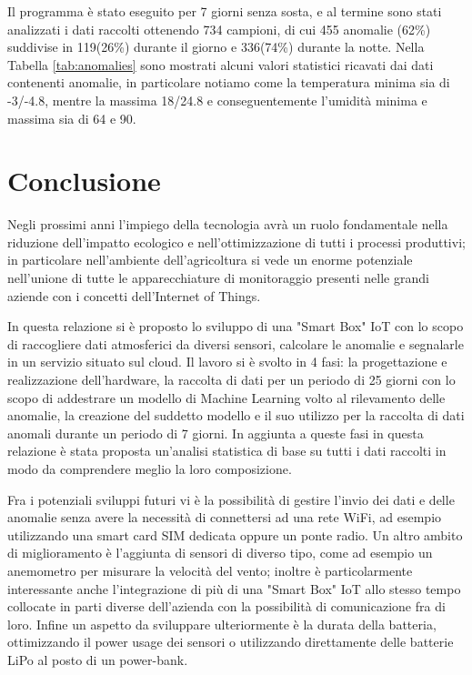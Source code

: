 \documentclass[fleqn, 10pt]{SelfArx}
\begin{document}
Il programma è stato eseguito per 7 giorni senza sosta, e al termine sono stati analizzati i dati raccolti ottenendo 734 campioni, di cui 455 anomalie (62\%) suddivise in 119(26\%) durante il giorno e 336(74\%) 
durante la notte. Nella Tabella \ref{tab:anomalies} sono mostrati alcuni valori statistici ricavati dai dati contenenti anomalie, in particolare notiamo come la temperatura minima sia di -3/-4.8, mentre la 
massima 18/24.8 e conseguentemente l'umidità minima e massima sia di 64 e 90.

\section{Conclusione}

Negli prossimi anni l'impiego della tecnologia avrà un ruolo fondamentale nella riduzione dell'impatto ecologico e nell'ottimizzazione di tutti i processi produttivi; in particolare nell'ambiente dell'agricoltura
si vede un enorme potenziale nell'unione di tutte le apparecchiature di monitoraggio presenti nelle grandi aziende con i concetti dell'Internet of Things. 

In questa relazione si è proposto lo sviluppo di una "Smart Box" IoT con lo scopo di raccogliere dati atmosferici da diversi sensori, calcolare le anomalie e segnalarle in un servizio situato sul cloud. 
Il lavoro si è svolto in 4 fasi: la progettazione e realizzazione dell'hardware, la raccolta di dati per un periodo di 25 giorni con lo scopo di addestrare un modello di Machine Learning volto al rilevamento delle 
anomalie, la creazione del suddetto modello e il suo utilizzo per la raccolta di dati anomali durante un periodo di 7 giorni. 
In aggiunta a queste fasi in questa relazione è stata proposta un'analisi statistica di base su tutti i dati raccolti in modo da comprendere meglio la loro composizione.

Fra i potenziali sviluppi futuri vi è la possibilità di gestire l'invio dei dati e delle anomalie senza avere la necessità di connettersi ad una rete WiFi, ad esempio utilizzando una smart card SIM dedicata oppure 
un ponte radio. Un altro ambito di miglioramento è l'aggiunta di sensori di diverso tipo, come ad esempio un anemometro per misurare la velocità del vento; inoltre è particolarmente interessante anche l'integrazione di 
più di una "Smart Box" IoT allo stesso tempo collocate in parti diverse dell'azienda con la possibilità di comunicazione fra di loro. 
Infine un aspetto da sviluppare ulteriormente è la durata della batteria, ottimizzando il power usage dei sensori o utilizzando direttamente delle batterie LiPo al posto di un power-bank.



\end{document}
